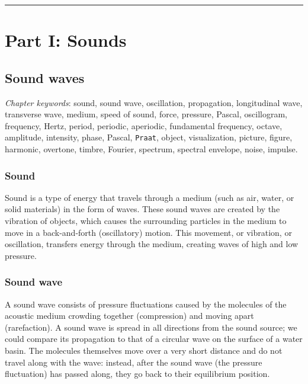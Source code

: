 \documentclass[
]{book}
\begin{document}
\begin{center}\rule{0.5\linewidth}{0.5pt}\end{center}

\part*{Part I: Sounds}\label{part-part-i-sounds}

\chapter{Sound waves}\label{ch-soundwaves}

\emph{Chapter keywords}: sound, sound wave, oscillation, propagation, longitudinal wave, transverse wave, medium, speed of sound, force, pressure, Pascal, oscillogram, frequency, Hertz, period, periodic, aperiodic, fundamental frequency, octave, amplitude, intensity, phase, Pascal, \texttt{Praat}, object, visualization, picture, figure, harmonic, overtone, timbre, Fourier, spectrum, spectral envelope, noise, impulse.

\section{Sound}\label{sound}

Sound is a type of energy that travels through a medium (such as air, water, or solid materials) in the form of waves. These sound waves are created by the vibration of objects, which causes the surrounding particles in the medium to move in a back-and-forth (oscillatory) motion. This movement, or vibration, or oscillation, transfers energy through the medium, creating waves of high and low pressure.

\section{Sound wave}\label{sec:soundwave}

A sound wave consists of pressure fluctuations caused by the molecules of the acoustic medium crowding together (compression) and moving apart (rarefaction). A sound wave is spread in all directions from the sound source; we could compare its propagation to that of a circular wave on the surface of a water basin. The molecules themselves move over a very short distance and do not travel along with the wave: instead, after the sound wave (the pressure fluctuation) has passed along, they go back to their equilibrium position.
\end{document}
